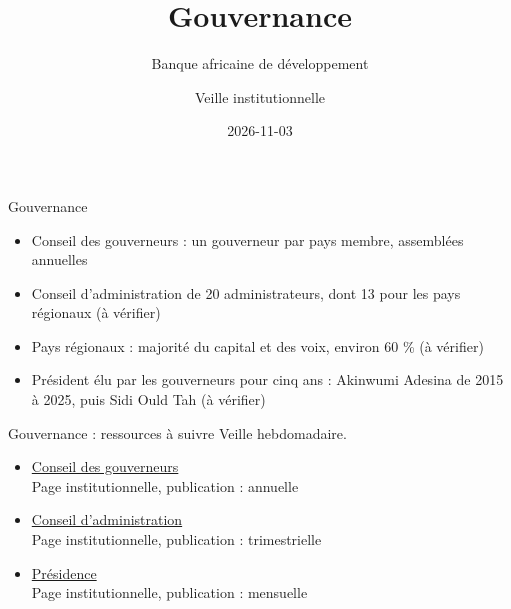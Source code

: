 \documentclass[aspectratio=169,11pt]{beamer}
\title{Gouvernance}
\subtitle{Banque africaine de développement}
\author{Veille institutionnelle}
\date{2026-11-03}
\begin{document}
\begin{frame}\titlepage\end{frame}

\begin{frame}{Gouvernance}
\begin{itemize}
\item Conseil des gouverneurs : un gouverneur par pays membre, assemblées annuelles
\item Conseil d'administration de 20 administrateurs, dont 13 pour les pays régionaux (à vérifier)
\item Pays régionaux : majorité du capital et des voix, environ 60 \% (à vérifier)
\item Président élu par les gouverneurs pour cinq ans : Akinwumi Adesina de 2015 à 2025, puis Sidi Ould Tah (à vérifier)
\end{itemize}
\end{frame}

\begin{frame}{Gouvernance : ressources à suivre}
\small
Veille hebdomadaire.
\begin{itemize}
\item \href{https://www.afdb.org/en/about-us/organizational-structure/board-of-governors}{Conseil des gouverneurs}\\{\footnotesize Page institutionnelle, publication : annuelle}
\item \href{https://www.afdb.org/en/about-us/organizational-structure/board-of-directors}{Conseil d'administration}\\{\footnotesize Page institutionnelle, publication : trimestrielle}
\item \href{https://www.afdb.org/en/about-us/organizational-structure/president}{Présidence}\\{\footnotesize Page institutionnelle, publication : mensuelle}
\end{itemize}
\end{frame}
\end{document}
